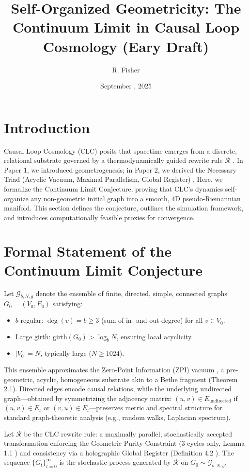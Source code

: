 \documentclass[11pt, a4paper]{article}
\title{\textbf{Self-Organized Geometricity: The Continuum Limit in Causal Loop Cosmology (Eary Draft)}}
\author{R. Fisher}
\date{September , 2025}
\begin{document}
\maketitle

\section{Introduction}
Causal Loop Cosmology (CLC) posits that spacetime emerges from a discrete, relational substrate governed by a thermodynamically guided rewrite rule $\mathcal{R}$ \cite{fisher2025}. In Paper 1, we introduced geometrogenesis; in Paper 2, we derived the Necessary Triad (Acyclic Vacuum, Maximal Parallelism, Global Register) \cite{fisher2025triad}. Here, we formalize the Continuum Limit Conjecture, proving that CLC’s dynamics self-organize any non-geometric initial graph into a smooth, 4D pseudo-Riemannian manifold. This section defines the conjecture, outlines the simulation framework, and introduces computationally feasible proxies for convergence.

\section{Formal Statement of the Continuum Limit Conjecture}

Let $\mathcal{G}_{b,N,g}$ denote the ensemble of finite, directed, simple, connected graphs $G_0 = (V_0, E_0)$ satisfying:
\begin{itemize}
  \item $b$-regular: $\deg(v) = b \geq 3$ (sum of in- and out-degree) for all $v \in V_0$.
  \item Large girth: $\text{girth}(G_0) > \log_b N$, ensuring local acyclicity.
  \item $|V_0| = N$, typically large ($N \geq 1024$).
\end{itemize}
This ensemble approximates the Zero-Point Information (ZPI) vacuum \cite{fisher2025triad}, a pre-geometric, acyclic, homogeneous substrate akin to a Bethe fragment (Theorem 2.1). Directed edges encode causal relations, while the underlying undirected graph—obtained by symmetrizing the adjacency matrix: $(u,v) \in E_{\text{undirected}}$ if $(u,v) \in E_t$ or $(v,u) \in E_t$—preserves metric and spectral structure for standard graph-theoretic analysis (e.g., random walks, Laplacian spectrum).

Let $\mathcal{R}$ be the CLC rewrite rule: a maximally parallel, stochastically accepted transformation enforcing the Geometric Purity Constraint (3-cycles only, Lemma 1.1 \cite{fisher2025triad}) and consistency via a holographic Global Register (Definition 4.2 \cite{fisher2025triad}). The sequence $\{G_t\}_{t=0}^\infty$ is the stochastic process generated by $\mathcal{R}$ on $G_0 \sim \mathcal{G}_{b,N,g}$.
\end{document}
